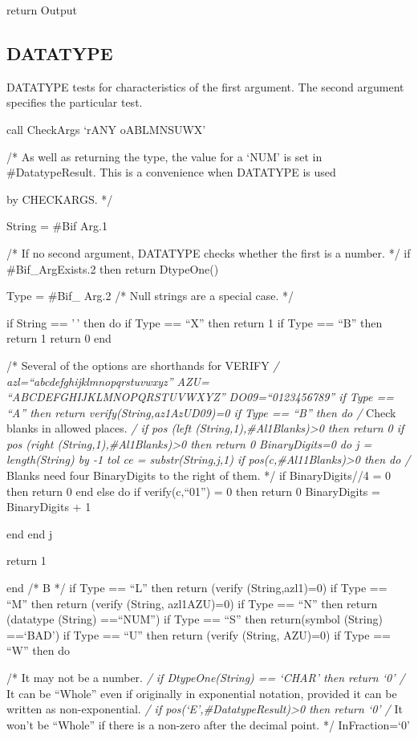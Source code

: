 return Output

\hypertarget{datatype}{%
\subsection{DATATYPE}\label{datatype}}

DATATYPE tests for characteristics of the first argument. The second
argument specifies the particular test.

call CheckArgs `rANY oABLMNSUWX'

/* As well as returning the type, the value for a `NUM' is set in
\#DatatypeResult. This is a convenience when DATATYPE is used

by CHECKARGS. */

String = \#Bif Arg.1

/* If no second argument, DATATYPE checks whether the first is a number.
*/ if \#Bif\_ArgExists.2 then return DtypeOne()

Type = \#Bif\_ Arg.2 /* Null strings are a special case. */

if String == '\,' then do if Type == ``X'' then return 1 if Type ==
``B'' then return 1 return 0 end

/* Several of the options are shorthands for VERIFY \emph{/
azl=``abcdefghijklmnopqrstuvwxyz'' AZU= ``ABCDEFGHIJKLMNOPQRSTUVWXYZ''
DO09=``0123456789'' if Type == ``A'' then return
verify(String,az1\textbar\textbar AzU\textbar\textbar D09)=0 if Type ==
``B'' then do /} Check blanks in allowed places. \emph{/ if pos (left
(String,1),\#Al1Blanks)\textgreater0 then return 0 if pos (right
(String,1),\#Al1Blanks)\textgreater0 then return 0 BinaryDigits=0 do j =
length(String) by -1 tol ce = substr(String,j,1) if
pos(c,\#Al11Blanks)\textgreater0 then do /} Blanks need four
BinaryDigits to the right of them. */ if BinaryDigits//4 = 0 then return
0 end else do if verify(c,``01'') = 0 then return 0 BinaryDigits =
BinaryDigits + 1

end end j

return 1

end /* B */ if Type == ``L'' then return (verify (String,azl1)=0) if
Type == ``M'' then return (verify (String, azl1\textbar\textbar AZU)=0)
if Type == ``N'' then return (datatype (String) ==``NUM'') if Type ==
``S'' then return(symbol (String) ==`BAD') if Type == ``U'' then return
(verify (String, AZU)=0) if Type == ``W'' then do

/* It may not be a number. \emph{/ if DtypeOne(String) == `CHAR' then
return `0' /} It can be ``Whole'' even if originally in exponential
notation, provided it can be written as non-exponential. \emph{/ if
pos(`E',\#DatatypeResult)\textgreater0 then return `0' /} It won't be
``Whole'' if there is a non-zero after the decimal point. */
InFraction=`0'

